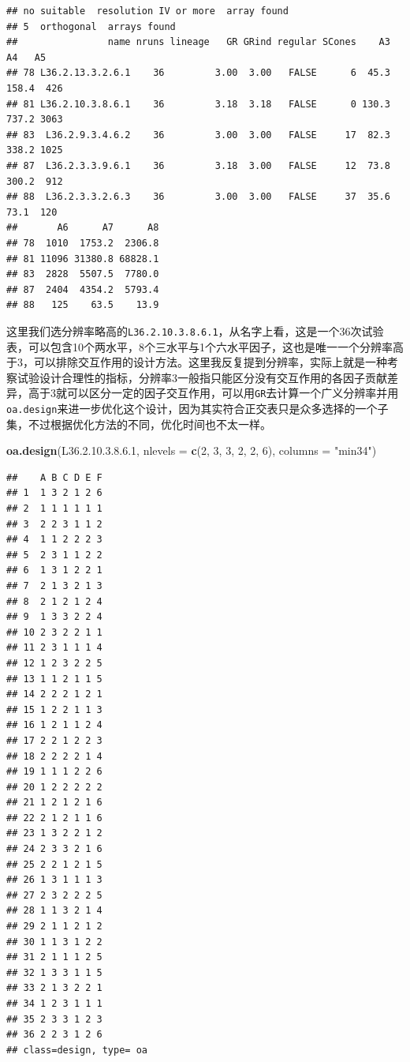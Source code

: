 \documentclass[]{tufte-book}
\newenvironment{Shaded}{}{}
\newcommand{\DataTypeTok}[1]{\textcolor[rgb]{0.56,0.13,0.00}{#1}}
\newcommand{\DecValTok}[1]{\textcolor[rgb]{0.25,0.63,0.44}{#1}}
\newcommand{\FloatTok}[1]{\textcolor[rgb]{0.25,0.63,0.44}{#1}}
\newcommand{\KeywordTok}[1]{\textcolor[rgb]{0.00,0.44,0.13}{\textbf{#1}}}
\newcommand{\NormalTok}[1]{#1}
\newcommand{\StringTok}[1]{\textcolor[rgb]{0.25,0.44,0.63}{#1}}
\begin{document}
\begin{verbatim}
## no suitable  resolution IV or more  array found
## 5  orthogonal  arrays found
##                name nruns lineage   GR GRind regular SCones    A3    A4   A5
## 78 L36.2.13.3.2.6.1    36         3.00  3.00   FALSE      6  45.3 158.4  426
## 81 L36.2.10.3.8.6.1    36         3.18  3.18   FALSE      0 130.3 737.2 3063
## 83  L36.2.9.3.4.6.2    36         3.00  3.00   FALSE     17  82.3 338.2 1025
## 87  L36.2.3.3.9.6.1    36         3.18  3.00   FALSE     12  73.8 300.2  912
## 88  L36.2.3.3.2.6.3    36         3.00  3.00   FALSE     37  35.6  73.1  120
##       A6      A7      A8
## 78  1010  1753.2  2306.8
## 81 11096 31380.8 68828.1
## 83  2828  5507.5  7780.0
## 87  2404  4354.2  5793.4
## 88   125    63.5    13.9
\end{verbatim}

这里我们选分辨率略高的\texttt{L36.2.10.3.8.6.1}，从名字上看，这是一个36次试验表，可以包含10个两水平，8个三水平与1个六水平因子，这也是唯一一个分辨率高于3，可以排除交互作用的设计方法。这里我反复提到分辨率，实际上就是一种考察试验设计合理性的指标，分辨率3一般指只能区分没有交互作用的各因子贡献差异，高于3就可以区分一定的因子交互作用，可以用\texttt{GR}去计算一个广义分辨率并用\texttt{oa.design}来进一步优化这个设计，因为其实符合正交表只是众多选择的一个子集，不过根据优化方法的不同，优化时间也不太一样。

\begin{Shaded}
\begin{Highlighting}[]
\KeywordTok{oa.design}\NormalTok{(L36.}\DecValTok{2}\NormalTok{.}\DecValTok{10}\NormalTok{.}\DecValTok{3}\NormalTok{.}\DecValTok{8}\NormalTok{.}\FloatTok{6.1}\NormalTok{, }\DataTypeTok{nlevels =} \KeywordTok{c}\NormalTok{(}\DecValTok{2}\NormalTok{, }\DecValTok{3}\NormalTok{, }\DecValTok{3}\NormalTok{, }\DecValTok{2}\NormalTok{, }\DecValTok{2}\NormalTok{, }\DecValTok{6}\NormalTok{), }\DataTypeTok{columns =} \StringTok{"min34"}\NormalTok{)}
\end{Highlighting}
\end{Shaded}

\begin{verbatim}
##    A B C D E F
## 1  1 3 2 1 2 6
## 2  1 1 1 1 1 1
## 3  2 2 3 1 1 2
## 4  1 1 2 2 2 3
## 5  2 3 1 1 2 2
## 6  1 3 1 2 2 1
## 7  2 1 3 2 1 3
## 8  2 1 2 1 2 4
## 9  1 3 3 2 2 4
## 10 2 3 2 2 1 1
## 11 2 3 1 1 1 4
## 12 1 2 3 2 2 5
## 13 1 1 2 1 1 5
## 14 2 2 2 1 2 1
## 15 1 2 2 1 1 3
## 16 1 2 1 1 2 4
## 17 2 2 1 2 2 3
## 18 2 2 2 2 1 4
## 19 1 1 1 2 2 6
## 20 1 2 2 2 2 2
## 21 1 2 1 2 1 6
## 22 2 1 2 1 1 6
## 23 1 3 2 2 1 2
## 24 2 3 3 2 1 6
## 25 2 2 1 2 1 5
## 26 1 3 1 1 1 3
## 27 2 3 2 2 2 5
## 28 1 1 3 2 1 4
## 29 2 1 1 2 1 2
## 30 1 1 3 1 2 2
## 31 2 1 1 1 2 5
## 32 1 3 3 1 1 5
## 33 2 1 3 2 2 1
## 34 1 2 3 1 1 1
## 35 2 3 3 1 2 3
## 36 2 2 3 1 2 6
## class=design, type= oa
\end{verbatim}
\end{document}
